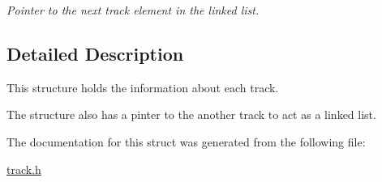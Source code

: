 \begin{DoxyCompactItemize}
\begin{DoxyCompactList}\small\item\em Pointer to the next track element in the linked list. \end{DoxyCompactList}\end{DoxyCompactItemize}



\subsection{Detailed Description}
This structure holds the information about each track. 

The structure also has a pinter to the another track to act as a linked list. 

The documentation for this struct was generated from the following file\-:\begin{DoxyCompactItemize}
\item 
\hyperlink{track_8h}{track.\-h}\end{DoxyCompactItemize}
